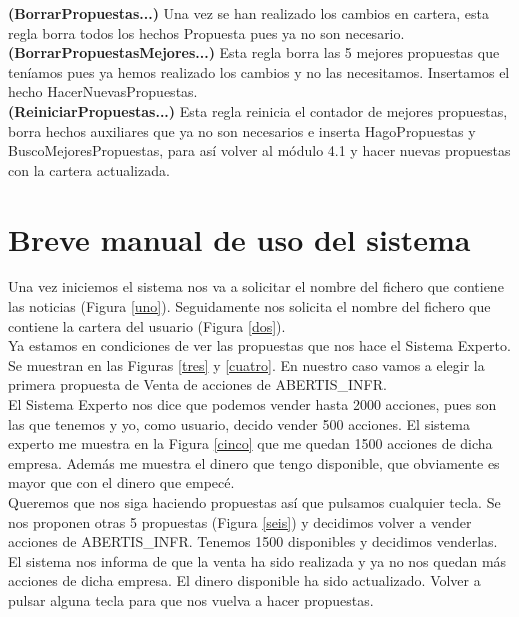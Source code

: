 \documentclass[12pt]{article}
\begin{document}
\textbf{(BorrarPropuestas...)}
Una vez se han realizado los cambios en cartera, esta regla borra todos los hechos Propuesta pues ya no son necesario.\\

\textbf{(BorrarPropuestasMejores...)}
Esta regla borra las 5 mejores propuestas que teníamos pues ya hemos realizado los cambios y no las necesitamos. Insertamos el hecho HacerNuevasPropuestas.\\

\textbf{(ReiniciarPropuestas...)}
Esta regla reinicia el contador de mejores propuestas, borra hechos auxiliares que ya no son necesarios e inserta HagoPropuestas y BuscoMejoresPropuestas, para así volver al módulo 4.1 y hacer nuevas propuestas con la cartera actualizada. 



\newpage
\section{Breve manual de uso del sistema}
Una vez iniciemos el sistema nos va a solicitar el nombre del fichero que contiene las noticias (Figura \ref{uno}). Seguidamente nos solicita el nombre del fichero que contiene la cartera del usuario (Figura \ref{dos}).\\

Ya estamos en condiciones de ver las propuestas que nos hace el Sistema Experto. Se muestran en las Figuras \ref{tres} y \ref{cuatro}. En nuestro caso vamos a elegir la primera propuesta de Venta de acciones de ABERTIS\_INFR. \\

El Sistema Experto nos dice que podemos vender hasta 2000 acciones, pues son las que tenemos y yo, como usuario, decido vender 500 acciones. El sistema experto me muestra en la Figura \ref{cinco} que me quedan 1500 acciones de dicha empresa. Además me muestra el dinero que tengo disponible, que obviamente es mayor que con el dinero que empecé.\\

Queremos que nos siga haciendo propuestas así que pulsamos cualquier tecla. Se nos proponen otras 5 propuestas (Figura \ref{seis}) y decidimos volver a vender acciones de ABERTIS\_INFR. Tenemos 1500 disponibles y decidimos venderlas.\\

El sistema nos informa de que la venta ha sido realizada y ya no nos quedan más acciones de dicha empresa. El dinero disponible ha sido actualizado. Volver a pulsar alguna tecla para que nos vuelva a hacer propuestas.\\
\end{document}
